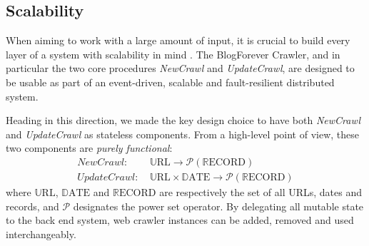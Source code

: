 \subsection{Scalability}
When aiming to work with a large amount of input, it is crucial to build every layer of a system with scalability in mind \cite{thereactivemanifesto2013}. The BlogForever Crawler, and in particular the two core procedures \emph{NewCrawl} and \emph{UpdateCrawl}, are designed to be usable as part of an event-driven, scalable and fault-resilient distributed system.

Heading in this direction, we made the key design choice to have both \emph{NewCrawl} and \emph{UpdateCrawl} as stateless components. From a high-level point of view, these two components are \emph{purely functional}:
%
\newcommand\URL{\mathbb{U}\text{RL}}
\newcommand\DATE{\mathbb{D}\text{ATE}}
\newcommand\RECORD{\mathbb{R}\text{ECORD}}
\begin{equation*}
  \begin{split}
    NewCrawl:    &~ \URL \rightarrow \mathcal{P}(\RECORD)\\
    UpdateCrawl: &~ \URL \times \DATE \rightarrow \mathcal{P}(\RECORD)
  \end{split}
\end{equation*}
%
where $\URL$, $\DATE$ and $\RECORD$ are respectively the set of all URLs, dates and records, and $\mathcal{P}$ designates the power set operator. By delegating all mutable state to the back end system, web crawler instances can be added, removed and used interchangeably.
